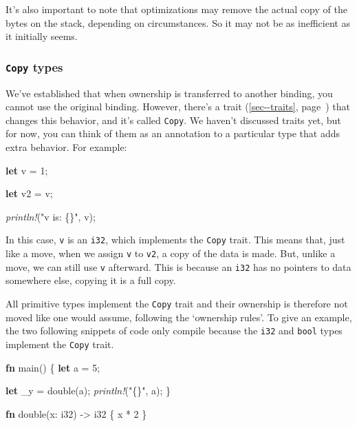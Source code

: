 \documentclass[a4paper,]{book}
\renewcommand*{\hyperlink}[2]{%
 #2 (\autoref{#1}, page~\pageref{#1})}
\newenvironment{Shaded}{\begin{snugshade}}{\end{snugshade}}
\newcommand{\KeywordTok}[1]{\textcolor[rgb]{0.13,0.29,0.53}{\textbf{{#1}}}}
\newcommand{\DataTypeTok}[1]{\textcolor[rgb]{0.13,0.29,0.53}{{#1}}}
\newcommand{\DecValTok}[1]{\textcolor[rgb]{0.00,0.00,0.81}{{#1}}}
\newcommand{\StringTok}[1]{\textcolor[rgb]{0.31,0.60,0.02}{{#1}}}
\newcommand{\PreprocessorTok}[1]{\textcolor[rgb]{0.56,0.35,0.01}{\textit{{#1}}}}
\newcommand{\NormalTok}[1]{{#1}}
\begin{document}
It's also important to note that optimizations may remove the actual
copy of the bytes on the stack, depending on circumstances. So it may
not be as inefficient as it initially seems.

\subsubsection{\texorpdfstring{\texttt{Copy}
types}{Copy types}}\label{copy-types}

We've established that when ownership is transferred to another binding,
you cannot use the original binding. However, there's a
\protect\hyperlink{sec--traits}{trait} that changes this behavior, and
it's called \texttt{Copy}. We haven't discussed traits yet, but for now,
you can think of them as an annotation to a particular type that adds
extra behavior. For example:

\begin{Shaded}
\begin{Highlighting}[]
\KeywordTok{let} \NormalTok{v = }\DecValTok{1}\NormalTok{;}

\KeywordTok{let} \NormalTok{v2 = v;}

\PreprocessorTok{println!}\NormalTok{(}\StringTok{"v is: \{\}"}\NormalTok{, v);}
\end{Highlighting}
\end{Shaded}

In this case, \texttt{v} is an \texttt{i32}, which implements the
\texttt{Copy} trait. This means that, just like a move, when we assign
\texttt{v} to \texttt{v2}, a copy of the data is made. But, unlike a
move, we can still use \texttt{v} afterward. This is because an
\texttt{i32} has no pointers to data somewhere else, copying it is a
full copy.

All primitive types implement the \texttt{Copy} trait and their
ownership is therefore not moved like one would assume, following the
`ownership rules'. To give an example, the two following snippets of
code only compile because the \texttt{i32} and \texttt{bool} types
implement the \texttt{Copy} trait.

\begin{Shaded}
\begin{Highlighting}[]
\KeywordTok{fn} \NormalTok{main() \{}
    \KeywordTok{let} \NormalTok{a = }\DecValTok{5}\NormalTok{;}

    \KeywordTok{let} \NormalTok{_y = double(a);}
    \PreprocessorTok{println!}\NormalTok{(}\StringTok{"\{\}"}\NormalTok{, a);}
\NormalTok{\}}

\KeywordTok{fn} \NormalTok{double(x: }\DataTypeTok{i32}\NormalTok{) -> }\DataTypeTok{i32} \NormalTok{\{}
    \NormalTok{x * }\DecValTok{2}
\NormalTok{\}}
\end{Highlighting}
\end{Shaded}
\end{document}
